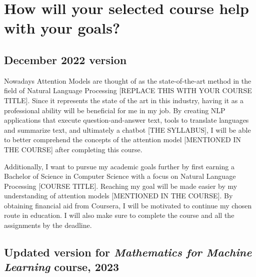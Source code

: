 \section{How will your selected course help with your goals?}

\subsection{December 2022 version}
Nowadays Attention Models are thought of as the state-of-the-art method in the field of Natural Language Processing [REPLACE THIS WITH YOUR COURSE TITLE]. Since it represents the state of the art in this industry, having it as a professional ability will be beneficial for me in my job. By creating NLP applications that execute question-and-answer text, tools to translate languages and summarize text, and ultimately a chatbot [THE SYLLABUS], I will be able to better comprehend the concepts of the attention model [MENTIONED IN THE COURSE] after completing this course. 

Additionally, I want to pursue my academic goals further by first earning a Bachelor of Science in Computer Science with a focus on Natural Language Processing [COURSE TITLE]. Reaching my goal will be made easier by my understanding of attention models [MENTIONED IN THE COURSE]. By obtaining financial aid from Coursera, I will be motivated to continue my chosen route in education. I will also make sure to complete the course and all the assignments by the deadline. 

\subsection{Updated version for \textit{Mathematics for Machine Learning} course, 2023}